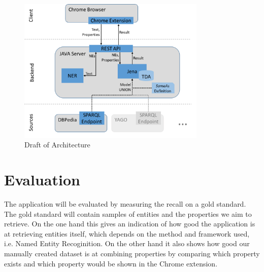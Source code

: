 \documentclass[11pt,titlepage,oneside,openany]{article}
\begin{document}
\begin{figure}[ht]
	\centering
	\includegraphics[width=0.8\textwidth]{architecture}
	\caption{Draft of Architecture}
	\label{fig:architecture}
\end{figure}


\section{Evaluation}
The application will be evaluated by measuring the recall on a gold standard.
The gold standard will contain samples of entities and the properties we aim to
retrieve. On the one hand this gives an indication of how good the application
is at retrieving entities itself, which depends on the method and framework used, i.e.
Named Entity Recoginition. On the other hand it also shows how good our manually
created dataset is at combining properties by comparing which property exists
and which property would be shown in the Chrome extension.
\end{document}
